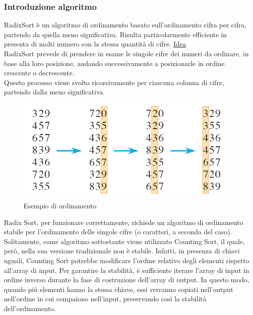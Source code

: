 \documentclass[a4paper, 11pt]{article}
\begin{document}
\subsubsection*{Introduzione algoritmo}
RadixSort è un algoritmo di ordinamento basato sull'ordinamento cifra per cifra, partendo da quella meno significativa. Risulta particolarmente efficiente in presenta di molti numero con la stessa quantità di cifre.\bigbreak
\noindent \underline{Idea}\\
RadixSort prevede di prendere in esame le singole cifre dei numeri da ordinare, in base alla loro posizione, andando successivamente a posizionarle in ordine crescente o decrescente.\\
Questo processo viene svolto ricorsivamente per ciascuna colonna di cifre, partendo dalla meno significativa.

\begin{figure}[H]
    \centering
    \includegraphics[scale=0.5]{./Immagini/RadixSort.png}
    \caption*{Esempio di ordinamento}
\end{figure}

Radix Sort, per funzionare correttamente, richiede un algoritmo di ordinamento stabile per l'ordinamento delle singole cifre (o caratteri, a seconda del caso).\bigbreak
\noindent Solitamente, come algoritmo sottostante viene utilizzato Counting Sort, il quale, però, nella sua versione tradizionale non è stabile. Infatti, in presenza di chiavi uguali, Counting Sort potrebbe modificare l'ordine relativo degli elementi rispetto all'array di input.\bigbreak
\noindent Per garantire la stabilità, è sufficiente iterare l'array di input in ordine inverso durante la fase di costruzione dell'array di output. In questo modo, quando più elementi hanno la stessa chiave, essi verranno copiati nell'output nell'ordine in cui compaiono nell'input, preservando così la stabilità dell'ordinamento.
\end{document}
